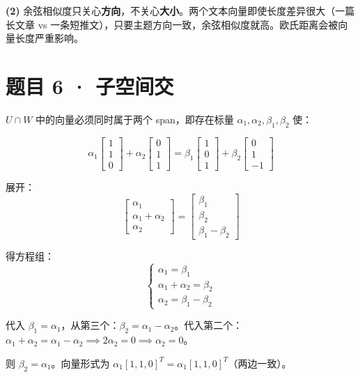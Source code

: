 \documentclass[12pt]{ctexart}
\begin{document}
\textbf{(2)} 余弦相似度只关心\textbf{方向}，不关心\textbf{大小}。两个文本向量即使长度差异很大（一篇长文章 vs 一条短推文），只要主题方向一致，余弦相似度就高。欧氏距离会被向量长度严重影响。

\section*{题目 6 · 子空间交}

$U \cap W$ 中的向量必须同时属于两个 span，即存在标量 $\alpha_1, \alpha_2, \beta_1, \beta_2$ 使：

\[
\alpha_1\begin{bmatrix}1\\1\\0\end{bmatrix} + \alpha_2\begin{bmatrix}0\\1\\1\end{bmatrix}
= \beta_1\begin{bmatrix}1\\0\\1\end{bmatrix} + \beta_2\begin{bmatrix}0\\1\\-1\end{bmatrix}
\]

展开：
\[
\begin{bmatrix} \alpha_1 \\ \alpha_1 + \alpha_2 \\ \alpha_2 \end{bmatrix}
= \begin{bmatrix} \beta_1 \\ \beta_2 \\ \beta_1 - \beta_2 \end{bmatrix}
\]

得方程组：
\[
\begin{cases}
\alpha_1 = \beta_1 \\
\alpha_1 + \alpha_2 = \beta_2 \\
\alpha_2 = \beta_1 - \beta_2
\end{cases}
\]

代入 $\beta_1 = \alpha_1$，从第三个：$\beta_2 = \alpha_1 - \alpha_2$。代入第二个：$\alpha_1 + \alpha_2 = \alpha_1 - \alpha_2 \implies 2\alpha_2 = 0 \implies \alpha_2 = 0$。

则 $\beta_2 = \alpha_1$。向量形式为 $\alpha_1[1, 1, 0]^T = \alpha_1[1, 1, 0]^T$（两边一致）。
\end{document}
